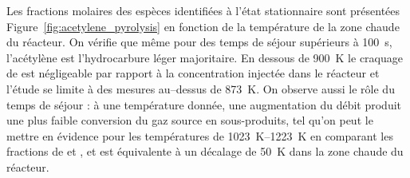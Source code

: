 \begin{table}[h]
  \caption{\label{tab:pyrolysis-conditions-pa}Conditions expérimentales pour l'étude de la pyrolyse du  à pression atmosphérique dans le réacteur présenté Figure~\ref{fig:reacteur_pa}.}
  
\end{table}

Les fractions molaires des espèces identifiées à l'état stationnaire sont présentées Figure~\ref{fig:acetylene_pyrolysis} en fonction de la température de la zone chaude du réacteur. On vérifie que même pour des temps de séjour supérieurs à \SI{100}{\second}, l'acétylène est l'hydrocarbure léger majoritaire. En dessous de \SI{900}{\kelvin} le craquage de  est négligeable par rapport à la concentration injectée dans le réacteur et l'étude se limite à des mesures au--dessus de \SI{873}{\kelvin}. On observe aussi le rôle du temps de séjour : à une température donnée, une augmentation du débit produit une plus faible conversion du gaz source en sous-produits, tel qu'on peut le mettre en évidence pour les températures de \SIrange{1023}{1223}{\kelvin} en comparant les fractions de  et , et est équivalente à un décalage de \SI{50}{\kelvin} dans\textsl{} la zone chaude du réacteur. %

